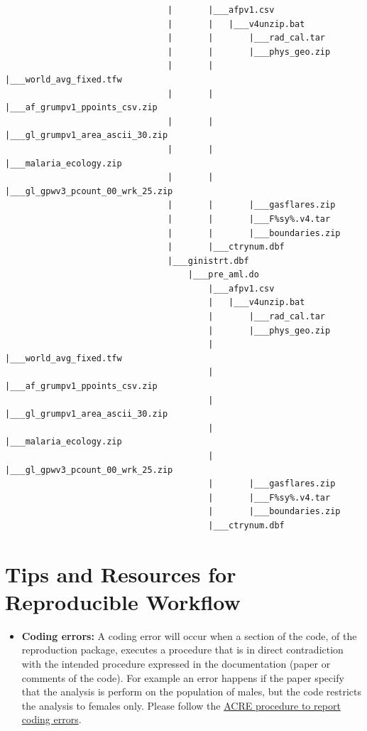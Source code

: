 \documentclass[]{book}
\providecommand{\tightlist}{%
  \setlength{\itemsep}{0pt}\setlength{\parskip}{0pt}}
\begin{document}
\begin{verbatim}
                                |       |___afpv1.csv
                                |       |   |___v4unzip.bat
                                |       |       |___rad_cal.tar
                                |       |       |___phys_geo.zip
                                |       |       |___world_avg_fixed.tfw
                                |       |       |___af_grumpv1_ppoints_csv.zip
                                |       |       |___gl_grumpv1_area_ascii_30.zip
                                |       |       |___malaria_ecology.zip
                                |       |       |___gl_gpwv3_pcount_00_wrk_25.zip
                                |       |       |___gasflares.zip
                                |       |       |___F%sy%.v4.tar
                                |       |       |___boundaries.zip
                                |       |___ctrynum.dbf
                                |___ginistrt.dbf
                                    |___pre_aml.do
                                        |___afpv1.csv
                                        |   |___v4unzip.bat
                                        |       |___rad_cal.tar
                                        |       |___phys_geo.zip
                                        |       |___world_avg_fixed.tfw
                                        |       |___af_grumpv1_ppoints_csv.zip
                                        |       |___gl_grumpv1_area_ascii_30.zip
                                        |       |___malaria_ecology.zip
                                        |       |___gl_gpwv3_pcount_00_wrk_25.zip
                                        |       |___gasflares.zip
                                        |       |___F%sy%.v4.tar
                                        |       |___boundaries.zip
                                        |___ctrynum.dbf
\end{verbatim}

\hypertarget{tips-and-resources-for-reproducible-workflow}{%
\chapter{Tips and Resources for Reproducible Workflow}\label{tips-and-resources-for-reproducible-workflow}}

\begin{itemize}
\tightlist
\item
  \textbf{Coding errors:} A coding error will occur when a section of the code, of the reproduction package, executes a procedure that is in direct contradiction with the intended procedure expressed in the documentation (paper or comments of the code). For example an error happens if the paper specify that the analysis is perform on the population of males, but the code restricts the analysis to females only. Please follow the \href{ADD\%20LINK}{ACRE procedure to report coding errors}.
\end{itemize}
\end{document}
